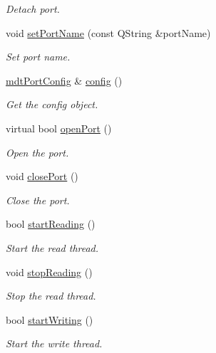 \begin{DoxyCompactItemize}
\begin{DoxyCompactList}\small\item\em Detach port. \end{DoxyCompactList}\item 
void \hyperlink{classmdt_port_manager_a2b2ed690cbba9f544c6ac1b46684e59a}{setPortName} (const QString \&portName)
\begin{DoxyCompactList}\small\item\em Set port name. \end{DoxyCompactList}\item 
\hyperlink{classmdt_port_config}{mdtPortConfig} \& \hyperlink{classmdt_port_manager_a9cf3ea2da38f81682695b37448712ffd}{config} ()
\begin{DoxyCompactList}\small\item\em Get the config object. \end{DoxyCompactList}\item 
virtual bool \hyperlink{classmdt_port_manager_aab594613e8985590c835194efbc27b5e}{openPort} ()
\begin{DoxyCompactList}\small\item\em Open the port. \end{DoxyCompactList}\item 
void \hyperlink{classmdt_port_manager_ace8065f1f5083041ee7f65c2892bc77d}{closePort} ()
\begin{DoxyCompactList}\small\item\em Close the port. \end{DoxyCompactList}\item 
bool \hyperlink{classmdt_port_manager_a696c2d649764ba7b5f299b0a8f3e5cc4}{startReading} ()
\begin{DoxyCompactList}\small\item\em Start the read thread. \end{DoxyCompactList}\item 
void \hyperlink{classmdt_port_manager_a6a06371d61f8f227df2806cde2ac1d11}{stopReading} ()
\begin{DoxyCompactList}\small\item\em Stop the read thread. \end{DoxyCompactList}\item 
bool \hyperlink{classmdt_port_manager_ac769ac4eb2b43a5a37be5b5d2a7bccbc}{startWriting} ()
\begin{DoxyCompactList}\small\item\em Start the write thread. \end{DoxyCompactList}\item 

\end{DoxyCompactItemize}
